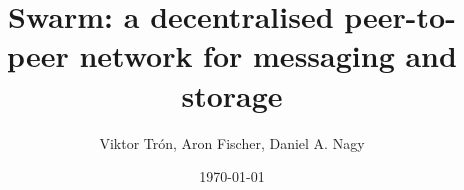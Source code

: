\documentclass[a4paper,10pt]{article}
\title{Swarm: a decentralised peer-to-peer network for messaging and storage}
\author{Viktor Trón, Aron Fischer, Daniel A. Nagy}
\date{\today}
\begin{document}
\maketitle

\setcounter{tocdepth}{3}
\tableofcontents


\cite{ethersphere2016sw3}
\cite{ethersphere2016smash}
\cite{maymounkov2002kademlia}
\cite{heep2010r}
\cite{malavolta2017concurrency}
\cite{chiesa2017decentralized}
\cite{heilman2016tumblebit}
\cite{green2016bolt}
\cite{miller2017sprites}
\cite{mcdonald2017payment}
\cite{diferrante2017payment}


\appendix
\printglossary
\end{document}
